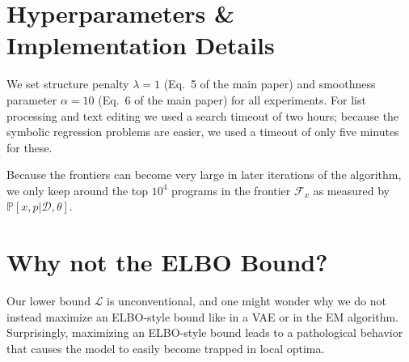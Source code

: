 \documentclass{article}
\newcommand{\lowerBound}{\mathscr{L}}
\newcommand{\probability}{\mathds{P}} %
\begin{document}

\section{Hyperparameters \& Implementation Details}
We set structure penalty $\lambda = 1$ (Eq.~5 of the main paper) and
smoothness parameter $\alpha = 10$ (Eq.~6 of the main paper)
for all experiments.
For list processing and text editing we used a search timeout of two hours;
because the symbolic regression problems are easier,
we used a timeout of only five minutes for these.


Because the frontiers can become very large in later iterations of the algorithm,
we only keep around the top $10^4$ programs in the frontier $\mathcal{F}_x$ as measured by $\probability[x,p|\mathcal{D},\theta]$.




\section{Why not the ELBO Bound?}

Our lower bound $\lowerBound$ is unconventional,
and one might wonder why we do not instead maximize an ELBO-style bound like in a VAE or in the EM algorithm.
Surprisingly, maximizing an ELBO-style bound
leads to a pathological behavior that  causes the model to easily become trapped in local optima.
\end{document}
